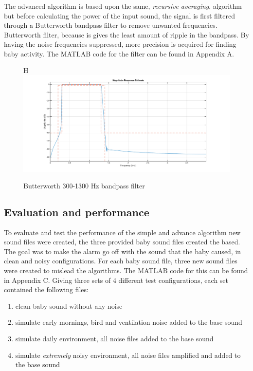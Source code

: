 The advanced algorithm is based upon the same, \emph{recursive averaging},
algorithm but before calculating the power of the input sound, the signal
is first filtered through a Butterworth bandpass filter to remove unwanted
frequencies. Butterworth filter, because is gives the least amount of
ripple in the bandpass. By having the noise frequencies suppressed, more
precision is acquired for finding baby activity. The MATLAB code for the
filter can be found in Appendix A.

\begin{figure}{H}
  \centering
  \includegraphics[width=1\textwidth]{sections/butt_pass_est.png}
  \caption{Butterworth 300-1300 Hz bandpass filter}
  \label{fig:butt_pass}
\end{figure}

\subsection{Evaluation and performance}
To evaluate and test the performance of the simple and advance algorithm new
sound files were created, the three provided baby sound files created the
based. The goal was to make the alarm go off with the sound that the baby
caused, in clean and noisy configurations.  For each baby sound file, three new
sound files were created to mislead the algorithms. The MATLAB code for this
can be found in Appendix C.  Giving three sets of 4 different test
configurations, each set contained the following files: 

\begin{enumerate}
  \item clean baby sound without any noise
  \item simulate early mornings, bird and ventilation noise added to the base
  sound
  \item simulate daily environment, all noise files added to the base sound
  \item simulate \emph{extremely} noisy environment, all noise files amplified
  and added to the base sound
\end{enumerate}

